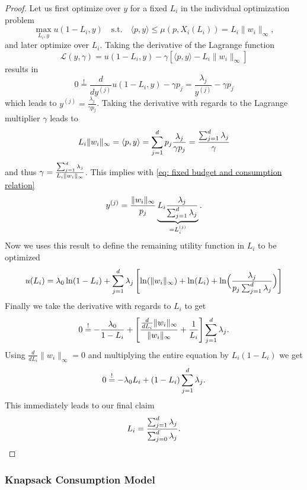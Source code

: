\begin{proof}
	Let us first optimize over \(y\) for a fixed \(L_i\) in the individual
	optimization problem
	\[
		\max_{L_i, y} u(1-L_i, y)
		\quad \text{s.t.}\quad
		\langle p, y\rangle \le \mu(p, X_i(L_i)) = L_i \|w_i\|_\infty,
	\]
	and later optimize over \(L_i\). Taking the derivative of the Lagrange
	function
	\[
		\mathcal{L}	(y, \gamma)
		= u(1-L_i, y) - \gamma [\langle p, y\rangle - L_i\|w_i\|_\infty]
	\]
	results in
	\[
		0\overset!= \frac{d}{d y^{(j)}}u(1-L_i,y) - \gamma p_j
		= \frac{\lambda_j}{y^{(j)}} - \gamma p_j
	\]
	which leads to \(y^{(j)} = \frac{\lambda_j}{\gamma p_j}\). Taking the
	derivative with regards to the Lagrange multiplier \(\gamma\) leads to
	\[
		L_i\|w_i\|_\infty = \langle p, y\rangle
		= \sum_{j=1}^d p_j \frac{\lambda_j}{\gamma p_j}
		= \frac{\sum_{j=1}^d \lambda_j}\gamma
	\]
	and thus \(\gamma = \frac{\sum_{j=1}^d \lambda_j}{L_i\|w_i\|_\infty}\).
	This implies with \eqref{eq: fixed budget and consumption relation}
	\[
		y^{(j)}
		= \frac{\|w_i\|_\infty}{p_j}
		\underbrace{L_i\frac{\lambda_j}{\sum_{j=1}^d \lambda_j}}_{=L_i^{(j)}}.
	\]
	Now we uses this result to define the remaining utility function in \(L_i\) 
	to be optimized
	\[
		u(L_i) = \lambda_0 \ln(1-L_i) + \sum_{j=1}^d \lambda_j \left[
			\ln(\|w_i\|_\infty) + \ln(L_i) + \ln\Bigl(\frac{\lambda_j}{p_j\sum_{j=1}^d \lambda_j}\Bigr)
		\right]
	\]
	Finally we take the derivative with regards to \(L_i\) to get
	\[
		0\overset!= -\frac{\lambda_0}{1-L_i}
		+ \left[
			\frac{\frac{d}{dL_i}\|w_i\|_\infty}{\|w_i\|_\infty}
			+ \frac1{L_i}
		\right]\sum_{j=1}^d \lambda_j.
	\]
	Using \(\frac{d}{dL_i}\|w_i\|_\infty = 0\) 
	and multiplying the entire equation by \(L_i(1-L_i)\) we get
	\[
		0\overset!= -\lambda_0L_i + (1-L_i)\sum_{j=1}^d \lambda_j.
	\]
	This immediately leads to our final claim
	\[
		L_i = \frac{\sum_{j=1}^d \lambda_j}{\sum_{j=0}^d \lambda_j}.
		\qedhere
	\]
\end{proof}

\subsubsection{Knapsack Consumption Model}

